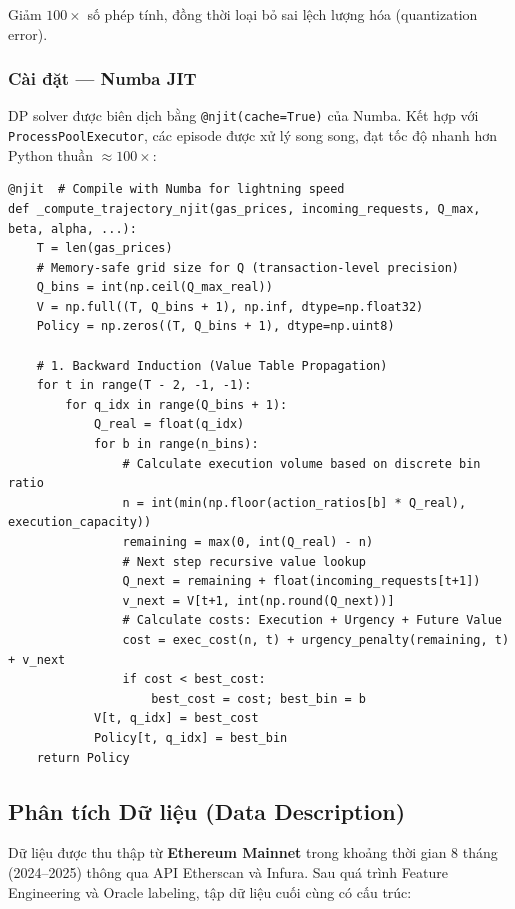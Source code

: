 Giảm $100\times$ số phép tính, đồng thời loại bỏ sai lệch lượng hóa (quantization error).

\subsubsection{Cài đặt — Numba JIT}

DP solver được biên dịch bằng \texttt{@njit(cache=True)} của Numba. Kết hợp với \texttt{ProcessPoolExecutor}, các episode được xử lý song song, đạt tốc độ nhanh hơn Python thuần $\approx100\times$:

\begin{lstlisting}[style=PythonStyle, caption={Numba-Optimized Backward Induction (Source: oracle\_builder.py)}]
@njit  # Compile with Numba for lightning speed
def _compute_trajectory_njit(gas_prices, incoming_requests, Q_max, beta, alpha, ...):
    T = len(gas_prices)
    # Memory-safe grid size for Q (transaction-level precision)
    Q_bins = int(np.ceil(Q_max_real))
    V = np.full((T, Q_bins + 1), np.inf, dtype=np.float32)
    Policy = np.zeros((T, Q_bins + 1), dtype=np.uint8)

    # 1. Backward Induction (Value Table Propagation)
    for t in range(T - 2, -1, -1):
        for q_idx in range(Q_bins + 1):
            Q_real = float(q_idx)
            for b in range(n_bins):
                # Calculate execution volume based on discrete bin ratio
                n = int(min(np.floor(action_ratios[b] * Q_real), execution_capacity))
                remaining = max(0, int(Q_real) - n)
                # Next step recursive value lookup
                Q_next = remaining + float(incoming_requests[t+1])
                v_next = V[t+1, int(np.round(Q_next))]
                # Calculate costs: Execution + Urgency + Future Value
                cost = exec_cost(n, t) + urgency_penalty(remaining, t) + v_next
                if cost < best_cost:
                    best_cost = cost; best_bin = b
            V[t, q_idx] = best_cost
            Policy[t, q_idx] = best_bin
    return Policy
\end{lstlisting}

\subsection{Phân tích Dữ liệu (Data Description)}

Dữ liệu được thu thập từ \textbf{Ethereum Mainnet} \cite{ethereum2022eip1559} trong khoảng thời gian 8 tháng (2024--2025) thông qua API Etherscan và Infura. Sau quá trình Feature Engineering và Oracle labeling, tập dữ liệu cuối cùng có cấu trúc:

